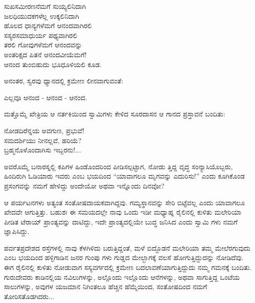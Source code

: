 \begin{myquote}
ಸುಖಸಮೀರಣನೆಮಗೆ ಸುಯ್ಯಲಿನಿದಾಗಿ\\ಜಲಧಿಯುದಕಗಳೆಲ್ಲ ಉಕ್ಕಲಿನಿದಾಗಿ\\ಹೊಲದ ಧಾನ್ಯಗಳೆಮಗೆ ಆನಂದವಾಗಿರಲಿ\\ಸಸ್ಯರಸಮಾಧುರ್ಯ ಪಥ್ಯವಾಗಿರಲಿ\\ತರಲಿ ಗೋವುಗಳೆಮಗೆ ಆನಂದವನ್ನು\\ಅಂತರಿಕ್ಷದ ಪಿತನೆ ಆನಂದವೀಯೆಮಗೆ!\\ಆನಂದ ತುಂಬಿಹುದು ಭೂಧೂಳಿಯಲಿ ಕೂಡ.
\end{myquote}

ಅನಂತರ, ಸ್ವರವು ಧ್ಯಾನದಲ್ಲಿ ಕ್ರಮೇಣ ಲೀನವಾಗುವಂತೆ:

\begin{myquote}
ಎಲ್ಲವೂ ಆನಂದ - ಆನಂದ - ಆನಂದ.
\end{myquote}

ಮತ್ತೊಮ್ಮೆ ಖೇತ್ರಿಯ ಆ ನರ್ತಕಿಯಿಂದ ಸ್ವಾಮಿಗಳು ಕೇಳಿದ ಸೂರದಾಸನ ಆ ಗಾನದ ಪ್ರಸ್ತಾವನೆ ಬಂದಿತು:

\begin{myquote}
ನೋಡದಿರೆನ್ನಯ ಅವಗುಣ, ಪ್ರಭುವೆ!\\ಸಮದರ್ಶಿಯು ನೀನಲ್ಲವೆ, ಹರಿಯೆ?\\ಬ್ರಹ್ಮನೊಳೊಂದಾಗಿಸು ಇಬ್ಬರನು!...
\end{myquote}

ಅವರೊಮ್ಮೆ ಬನಾರಸ್ನಲ್ಲಿ ಕಪಿಗಳ ಹಿಂಡೊಂದರಿಂದ ಪೀಡಿಸಲ್ಪಟ್ಟಾಗ, ನೋಡು ತ್ತಿದ್ದ ವೃದ್ಧ ಸಂನ್ಯಾಸಿಯೊಬ್ಬರು, ಹಿಂದಿರುಗಿ ಓಡಿಯಾರು ಇವರು ಎಂಬ ಭಯದಿಂದ “ಯಾವಾಗಲೂ ಮೃಗವನ್ನು ಎದುರಿಸು!” ಎಂದು ಕೂಗಿಕೊಂಡ ಪ್ರಸಂಗವನ್ನು ನಮಗೆ ಹೇಳಿದ್ದು ಅಂದೇಯೋ ಅಥವಾ ಇನ್ನೊಂದು ದಿನವೋ?

ಆ ಪರ್ಯಟನಗಳು ಅತ್ಯಂತ ಸಂತೋಷದಾಯಕವಾಗಿದ್ದವು. ಗಮ್ಯಸ್ಥಾನವನ್ನು ಸೇರಿ ಬಿಟ್ಟೆವಲ್ಲ ಎಂದು ಯಾವಾಗಲೂ ಖೇದವೇ ಆಗುತ್ತಿತ್ತು. ಬಹುಶಃ ಈ ಸಮಯದಲ್ಲೇ ನಾವು ಒಂದು ಇಡೀ ಮಧ್ಯಾಹ್ನ ರೈಲಿನಲ್ಲಿ ಕುಳಿತು ಮಲೇರಿಯಾ ಪೀಡಿತ ಟೆರಾಯ್​ ಪ್ರಾಂತ್ಯವನ್ನು ದಾಟಿದ್ದು, ಇದೇ ಪ್ರಾಂತ್ಯದಲ್ಲಿಯೇ ಬುದ್ಧ ಜನಿಸಿದ ಎಂದು ಸ್ವಾಮಿ ಗಳು ನಮಗೆ ಜ್ಞಾಪಿಸಿದ್ದು.

ಪರ್ವತಪ್ರದೇಶದ ರಸ್ತೆಗಳಲ್ಲಿ ನಾವು ಕೆಳಗಿಳಿದು ಬರುತ್ತಿದ್ದಂತೆ, ಮಳೆ ಬಿದ್ದೊಡನೆ ಮಲೇರಿಯಾ ತಮ್ಮ ಮೇಲೆರಗುವುದು ಎಂಬ ಭಯದಿಂದ ಹಳ್ಳಿಗಾಡಿನ ಜನರ ಗುಂಪು ಗಳು ಗುಡ್ಡದ ಮೇಲ್ಭಾಗಕ್ಕೆ ವಲಸೆ ಹೋಗುತ್ತಿದ್ದುದನ್ನು ನೋಡಿದೆವು. ಈಗ ರೈಲಿನಲ್ಲಿ ಕುಳಿತು ನೋಡುವಾಗ ಸಸ್ಯವರ್ಗದಲ್ಲಿ ಕ್ರಮೇಣ ಬದಲಾವಣೆಯಾಗುತ್ತಿದ್ದುದು ನಮ್ಮ ಗಮನಕ್ಕೆ ಬಂದಿತು. ಗುರುದೇವರು ಕಾಡಿನಲ್ಲಿಯ ನವಿಲುಗಳನ್ನು, ಅಲ್ಲೊಂದು ಇಲ್ಲೊಂದು ಆನೆಗಳನ್ನು, ಅಥವಾ ಸಾಗುತ್ತಿದ್ದ ಒಂಟೆಯ ಸಾಲುಗಳನ್ನು, ಅವುಗಳ ಯಜಮಾನ ನಿಗಿಂತಲೂ ಹೆಚ್ಚಿನ ಹೆಮ್ಮೆಯಿಂದ, ಸಂತೋಷದಿಂದ ನಮಗೆ ತೋರಿಸತೊಡಗಿದರು...

